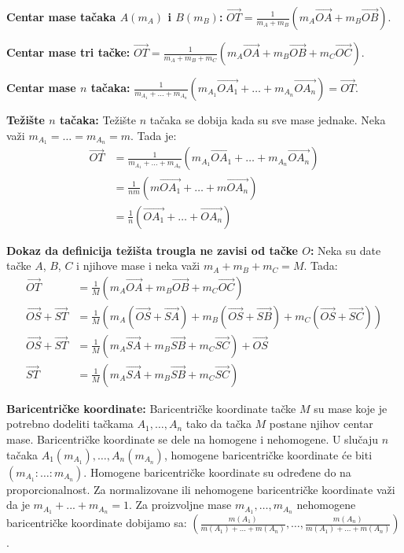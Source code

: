 \documentclass[12pt]{article}
\newcommand{\vek}[1]{\overrightarrow{#1}}
\begin{document}
\textbf{Centar mase tačaka $A(m_A)$ i $B(m_B)$:}
$\vek{OT}=\frac{1}{m_A+m_B}(m_A\vek{OA}+m_B\vek{OB})$.
\par

\textbf{Centar mase tri tačke:}
$\vek{OT}=\frac{1}{m_A+m_B+m_C}(m_A\vek{OA}+m_B\vek{OB}+m_C\vek{OC})$.
\par

\textbf{Centar mase $n$ tačaka:}
$\frac{1}{m_{A_1}+\dotsc+m_{A_n}}(m_{A_1}\vek{OA_1}+\dotsc+m_{A_n}\vek{OA_n})=\vek{OT}$.
\par

\textbf{Težište $n$ tačaka:} Težište $n$ tačaka se dobija kada su sve mase
jednake. Neka važi $m_{A_1}=\dotsc=m_{A_n}=m$. Tada je:
\begin{align*}
    \vek{OT} & =\frac{1}{m_{A_1}+\dotsc+m_{A_n}}(m_{A_1}\vek{OA_1}+\dotsc+m_{A_n}\vek{OA_n}) \\
             & =\frac{1}{nm}(m\vek{OA_1}+\dotsc+m\vek{OA_n})                                 \\
             & =\frac{1}{n}(\vek{OA_1}+\dotsc+\vek{OA_n})
\end{align*}
\par

\textbf{Dokaz da definicija težišta trougla ne zavisi od tačke $O$:} Neka su
date tačke $A$, $B$, $C$ i njihove mase i neka važi $m_{A}+m_{B}+m_{C}=M$.
Tada:
\begin{align*}
    \vek{OT}          & =\frac{1}{M}(m_{A}\vek{OA} +m_{B}\vek{OB} +m_{C}\vek{OC} )                                  \\
    \vek{OS}+\vek{ST} & =\frac{1}{M}(m_{A}(\vek{OS}+\vek{SA}) +m_{B}(\vek{OS}+\vek{SB}) +m_{C}(\vek{OS}+\vek{SC}) ) \\
    \vek{OS}+\vek{ST} & =\frac{1}{M}(m_{A}\vek{SA} +m_{B}\vek{SB} + m_{C}\vek{SC})+\vek{OS}                         \\
    \vek{ST}          & =\frac{1}{M}(m_{A}\vek{SA} +m_{B}\vek{SB} +m_{C}\vek{SC} )
\end{align*}
\par

\textbf{Baricentričke koordinate:} Baricentričke koordinate tačke $M$ su mase
koje je potrebno dodeliti tačkama $A_1,\dotsc,A_n$ tako da tačka $M$ postane
njihov centar mase. Baricentričke koordinate se dele na homogene i nehomogene.
U slučaju $n$ tačaka $A_1(m_{A_1}),\dotsc,A_n(m_{A_n})$, homogene
baricentričke koordinate će biti $(m_{A_1}:\dotsc:m_{A_n})$. Homogene
baricentričke koordinate su određene do na proporcionalnost. Za normalizovane
ili nehomogene baricentričke koordinate važi da je $m_{A_1}+...+m_{A_n}=1$. Za
proizvoljne mase $m_{A_1},\dotsc,m_{A_n}$ nehomogene baricentričke koordinate
dobijamo sa:
$(\frac{m(A_1)}{m(A_1)+\dotsc+m(A_n)},\dotsc,\frac{m(A_n)}{m(A_1)+\dotsc+m(A_n)})$.
\end{document}
